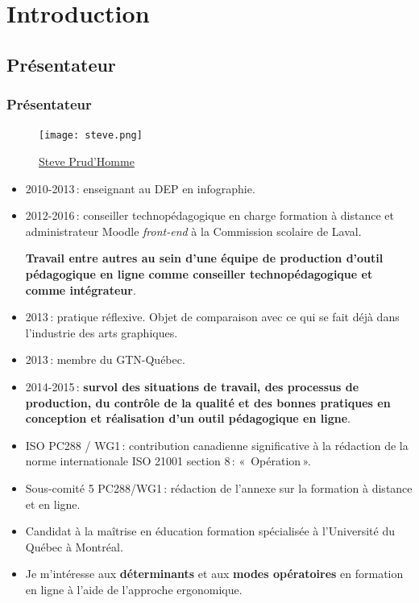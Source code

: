 	\section{Introduction} 
		
		
	\subsection{Présentateur} 
		\begin{frame}[allowframebreaks]
			\frametitle{Présentateur}
			\begin{figure}
                     			\centering
                    			 \texttt{[image: steve.png]}
                     			\caption{\tiny{\href{run:steve.png}{Steve Prud'Homme}}}
                   			\end{figure}
			\begin {itemize}
				
                                \item 2010-2013\,: enseignant au DEP en  infographie.
                                \item 2012-2016\,: conseiller technopédagogique en charge formation à distance et administrateur Moodle \textit{front-end} à la Commission scolaire de Laval. \par \textbf{Travail entre autres au sein d’une équipe de production d’outil pédagogique en ligne comme conseiller technopédagogique et comme intégrateur}.
                                \item 2013\,: pratique réflexive. Objet de comparaison avec ce qui se fait déjà dans l’industrie des arts graphiques.
                                \item 2013\,: membre du GTN-Québec.
                                \item 2014-2015\,: \textbf{survol des situations de travail, des processus de production, du contrôle de la qualité et des bonnes pratiques en conception et réalisation d’un outil pédagogique en ligne}.  
                                \item ISO PC288 / WG1\,: contribution canadienne significative à la rédaction de la norme internationale ISO 21001 section 8\,: «\, Opération\,».
                                \item Sous-comité 5 PC288/WG1\,: rédaction de l’annexe sur la formation à distance et en ligne.
                                \item Candidat à la maîtrise en éducation formation spécialisée à l'Université du Québec à Montréal.
                                \item Je m'intéresse aux \textbf{déterminants} et aux \textbf{modes opératoires} en formation en ligne à l’aide de l’approche ergonomique.



			\end{itemize}
		\end{frame}
			
